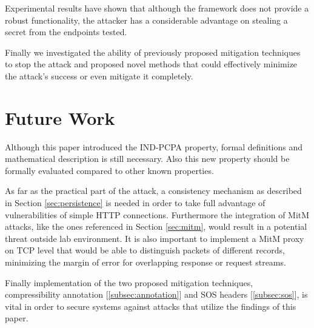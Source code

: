 Experimental results have shown that although the framework does not provide a
robust functionality, the attacker has a considerable advantage on
stealing a secret from the endpoints tested.

Finally we investigated the ability of previously proposed mitigation techniques
to stop the attack and proposed novel methods that could effectively minimize
the attack's success or even mitigate it completely.

\section{Future Work}

Although this paper introduced the IND-PCPA property, formal definitions and
mathematical description is still necessary. Also this new property should be
formally evaluated compared to other known properties.

As far as the practical part of the attack, a consistency mechanism as
described in Section \ref{sec:persistence} is needed in order to take full
advantage of vulnerabilities of simple HTTP connections. Furthermore the
integration of MitM attacks, like the ones referenced in Section \ref{sec:mitm},
would result in a potential threat outside lab environment. It is also important
to implement a MitM proxy on TCP level that would be able to distinguish
packets of different records, minimizing the margin of error for overlapping
response or request streams.

Finally implementation of the two proposed mitigation techniques,
compressibility annotation [\ref{subsec:annotation}] and SOS headers
[\ref{subsec:sos}], is vital in order to secure systems against attacks that
utilize the findings of this paper.
